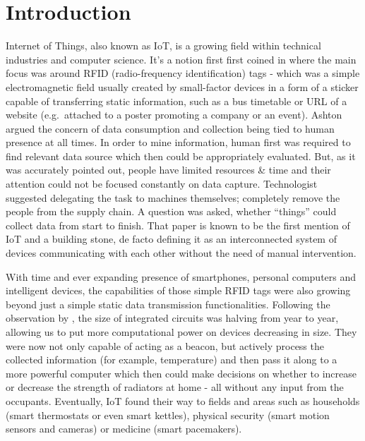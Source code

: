 \chapter{Introduction\label{chap:introduction}}

Internet of Things, also known as IoT, is a growing field within technical industries and computer science. It's a notion first first coined in \citet{ashton1999introduction} where the main focus was around RFID (radio-frequency identification) tags - which was a simple electromagnetic field usually created by small-factor devices in a form of a sticker capable of transferring static information, such as a bus timetable or URL of a website (e.g.\ attached to a poster promoting a company or an event). Ashton argued the concern of data consumption and collection being tied to human presence at all times. In order to mine information, human first was required to find relevant data source which then could be appropriately evaluated. But, as it was accurately pointed out, people have limited resources \& time and their attention could not be focused constantly on data capture. Technologist suggested delegating the task to machines themselves; completely remove the people from the supply chain. A question was asked, whether ``things'' could collect data from start to finish. That paper is known to be the first mention of IoT and a building stone, de facto defining it as an interconnected system of devices communicating with each other without the need of manual intervention.

With time and ever expanding presence of smartphones, personal computers and intelligent devices, the capabilities of those simple RFID tags were also growing beyond just a simple static data transmission functionalities. Following the observation by \citeauthor{moore1965cramming}, the size of integrated circuits was halving from year to year, allowing us to put more computational power on devices decreasing in size. They were now not only capable of acting as a beacon, but actively process the collected information (for example, temperature) and then pass it along to a more powerful computer which then could make decisions on whether to increase or decrease the strength of radiators at home - all without any input from the occupants. Eventually, IoT found their way to fields and areas such as households (smart thermostats or even smart kettles), physical security (smart motion sensors and cameras) or medicine (smart pacemakers).

